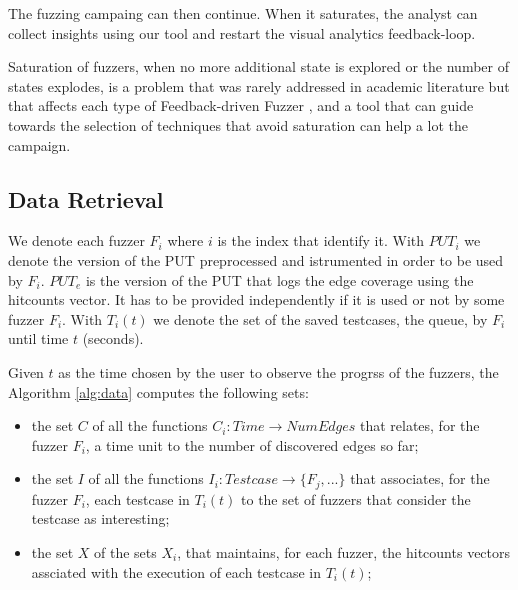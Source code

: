 \documentclass[conference,compsoc]{IEEEtran}
\begin{document}
The fuzzing campaing can then continue. When it saturates, the analyst can collect insights using our tool and restart the visual analytics feedback-loop.

Saturation of fuzzers, when no more additional state is explored or the number of states explodes, is a problem that was rarely addressed in academic literature but that affects each type of Feedback-driven Fuzzer \cite{saturation},  and a tool that can guide towards the selection of techniques that avoid saturation can help a lot the campaign.

\subsection{Data Retrieval}


We denote each fuzzer $F_i$ where $i$ is the index that identify it. 
With $PUT_i$ we denote the version of the PUT preprocessed and istrumented in order to be used by $F_i$.
$PUT_e$ is the version of the PUT that logs the edge coverage using the hitcounts vector. It has to be provided independently if it is used or not by some fuzzer $F_i$.
With $T_i(t)$ we denote the set of the saved testcases, the queue, by $F_i$ until time $t$ (seconds).

Given $t$ as the time chosen by the user to observe the progrss of the fuzzers, the Algorithm \ref{alg:data} computes the following sets:

\begin{itemize}
\item the set $C$ of all the functions $C_i \colon Time \longrightarrow NumEdges$ that relates, for the fuzzer $F_i$, a time unit to the number of discovered edges so far;
\item the set $I$ of all the functions $I_i \colon Testcase \longrightarrow \{F_j, ...\}$ that associates, for the fuzzer $F_i$, each testcase in $T_i(t)$ to the set of fuzzers that consider the testcase as interesting;
\item the set $X$ of the sets $X_i$, that maintains, for each fuzzer, the hitcounts vectors assciated with the execution of each testcase in $T_i(t)$;
\end{itemize}
\end{document}
